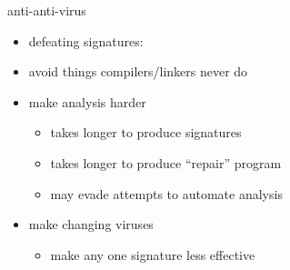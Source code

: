 
\begin{frame}{anti-anti-virus}
    \begin{itemize}
    \item defeating signatures:
    \vspace{.5cm}
    \item avoid things compilers/linkers never do
    \item make analysis harder
        \begin{itemize}
        \item takes longer to produce signatures
        \item takes longer to produce ``repair'' program
        \item may evade attempts to automate analysis
        \end{itemize}
    \item make changing viruses
        \begin{itemize}
        \item make any one signature less effective
        \end{itemize}
    \end{itemize}
\end{frame}



